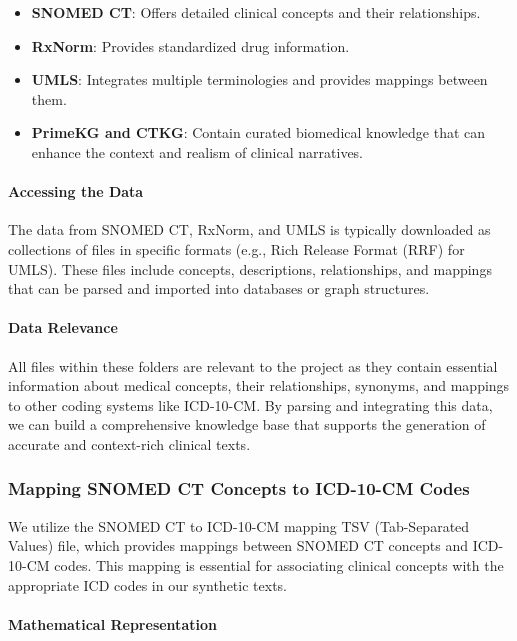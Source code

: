 \documentclass[12pt, a4paper]{article}
\begin{document}
\begin{itemize}
    \item \textbf{SNOMED CT}: Offers detailed clinical concepts and their relationships.
    \item \textbf{RxNorm}: Provides standardized drug information.
    \item \textbf{UMLS}: Integrates multiple terminologies and provides mappings between them.
    \item \textbf{PrimeKG and CTKG}: Contain curated biomedical knowledge that can enhance the context and realism of clinical narratives.
\end{itemize}

\paragraph{Accessing the Data}

The data from SNOMED CT, RxNorm, and UMLS is typically downloaded as collections of files in specific formats (e.g., Rich Release Format (RRF) for UMLS). These files include concepts, descriptions, relationships, and mappings that can be parsed and imported into databases or graph structures.

\paragraph{Data Relevance}

All files within these folders are relevant to the project as they contain essential information about medical concepts, their relationships, synonyms, and mappings to other coding systems like ICD-10-CM. By parsing and integrating this data, we can build a comprehensive knowledge base that supports the generation of accurate and context-rich clinical texts.

\subsubsection{Mapping SNOMED CT Concepts to ICD-10-CM Codes}

We utilize the SNOMED CT to ICD-10-CM mapping TSV (Tab-Separated Values) file, which provides mappings between SNOMED CT concepts and ICD-10-CM codes. This mapping is essential for associating clinical concepts with the appropriate ICD codes in our synthetic texts.

\paragraph{Mathematical Representation}
\end{document}
